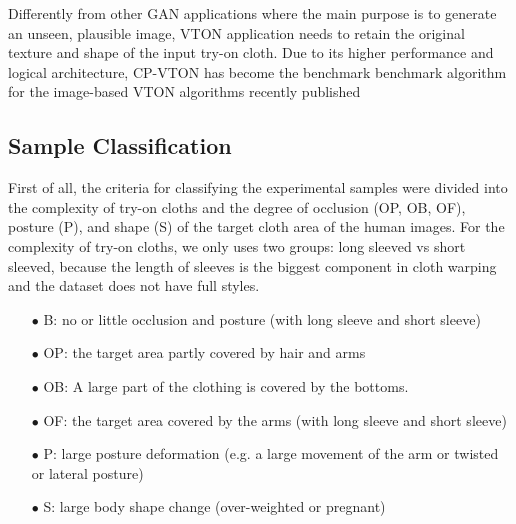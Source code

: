 Differently from other GAN applications where the main purpose is to generate an unseen, plausible image, VTON application needs to retain the original texture and shape of the input try-on cloth. Due to its higher performance and logical architecture, CP-VTON \cite{Wang2018TowardCI} has become the benchmark benchmark algorithm for the image-based VTON algorithms recently published 



 
\subsection{Sample Classification}

First of all, the criteria for classifying the experimental samples were divided into the complexity of try-on cloths and the degree of occlusion (OP, OB, OF), posture (P), and shape (S) of the target cloth area of the human images. For the complexity of try-on cloths, we only uses two groups: long sleeved vs short sleeved, because the length of sleeves is the biggest component in cloth warping and the dataset does not have full styles.    



\begin{itemize}

\item[$\bullet$] B:  no or little occlusion and posture (with long sleeve and  short sleeve)
\item[$\bullet$] OP: the target area partly covered by hair and arms
\item[$\bullet$] OB: A large part of the clothing is covered by the bottoms.
\item[$\bullet$] OF: the target area covered by the arms (with long sleeve and short sleeve)
\item[$\bullet$] P:  large posture deformation (e.g. a large movement of the arm or twisted or lateral posture)
\item[$\bullet$] S:  large body shape change  (over-weighted or pregnant)

\end{itemize}

